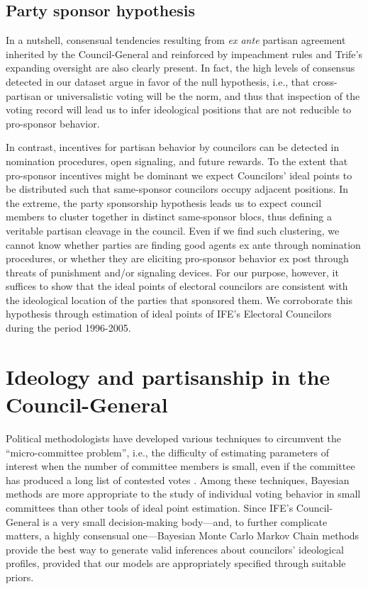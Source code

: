 \documentclass[12 pt]{article}
\begin{document}
\subsection{Party sponsor hypothesis}
In a nutshell, consensual tendencies resulting from \emph{ex ante} partisan agreement inherited by the Council-General and reinforced by impeachment rules and {\sc Trife}'s expanding oversight are also clearly present.  In fact, the high levels of consensus detected in our dataset argue in favor of the null hypothesis, i.e., that cross-partisan or universalistic voting will be the norm, and thus that inspection of the voting record will lead us to infer ideological positions that are not reducible to pro-sponsor behavior.

In contrast, incentives for partisan behavior by councilors can be detected in nomination procedures, open signaling, and future rewards.  To the extent that pro-sponsor incentives might be dominant we expect Councilors' ideal points to be distributed such that same-sponsor councilors occupy adjacent positions.  In the extreme, the party sponsorship hypothesis leads us to expect council members to cluster together in distinct same-sponsor blocs, thus defining a veritable partisan cleavage in the council.  Even if we find such clustering, we cannot know whether parties are finding good agents ex ante through nomination procedures, or whether they are eliciting pro-sponsor behavior ex post through threats of punishment and/or signaling devices.  For our purpose, however, it suffices to show that the ideal points of electoral councilors are consistent with the ideological location of the parties that sponsored them.  We corroborate this hypothesis through estimation of ideal points of IFE's Electoral Councilors during the period 1996-2005.

\singlespacing
\section{Ideology and partisanship in the Council-General}\label{S:estimation}
\doublespacing
Political methodologists have developed various techniques to circumvent the ``micro-committee problem'', i.e., the difficulty of estimating parameters of interest when the number of committee members is small, even if the committee has produced a long list of contested votes \citep{Londregan2000}.  Among these techniques, Bayesian methods \citep{Martin2002, Clinton2004, Jackman2001} are more appropriate to the study of individual voting behavior in small committees than other tools of ideal point estimation.  Since IFE's Council-General is a very small decision-making body---and, to further complicate matters, a highly consensual one---Bayesian Monte Carlo Markov Chain methods provide the best way to generate valid inferences about councilors' ideological profiles, provided that our models are appropriately specified through suitable priors.
\end{document}
